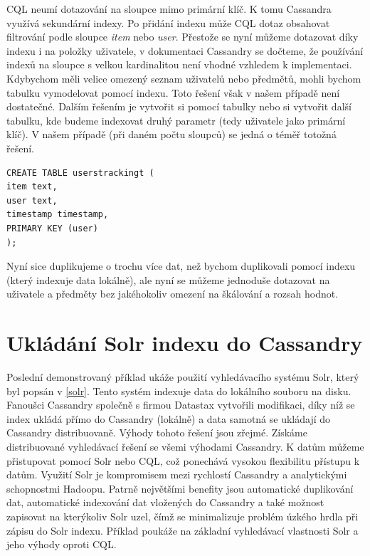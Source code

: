 CQL neumí dotazování na sloupce mimo primární klíč. K tomu Cassandra využívá sekundární indexy. Po přidání indexu může CQL dotaz obsahovat filtrování podle sloupce \emph{item} nebo \emph{user}. Přestože se nyní můžeme dotazovat díky indexu i na položky uživatele, v dokumentaci Cassandry \cite{cassaindex} se dočteme, že používání indexů na sloupce s velkou kardinalitou není vhodné vzhledem k implementaci. Kdybychom měli velice omezený seznam uživatelů nebo předmětů, mohli bychom tabulku vymodelovat pomocí indexu. Toto řešení však v našem případě není dostatečné. Dalším řešením je vytvořit si  pomocí tabulky nebo si vytvořit další tabulku, kde budeme indexovat druhý parametr (tedy uživatele jako primární klíč). V našem případě (při daném počtu sloupců) se jedná o téměř totožná řešení. 

\begin{lstlisting}[caption={Vytvoření indexovací tabulky},label=CQL11]
CREATE TABLE userstrackingt ( 
item text,
user text,
timestamp timestamp,
PRIMARY KEY (user)
);
\end{lstlisting}

Nyní sice duplikujeme o trochu více dat, než bychom duplikovali pomocí indexu (který indexuje data lokálně), ale nyní se můžeme jednoduše dotazovat na uživatele a předměty bez jakéhokoliv omezení na škálování a rozsah hodnot. 

\section{Ukládání Solr indexu do Cassandry}
Poslední demonstrovaný příklad ukáže použití vyhledávacího systému Solr, který byl popsán v  \ref{solr}. Tento systém indexuje data do lokálního souboru na disku. Fanoušci Cassandry společně s firmou Datastax vytvořili modifikaci, díky níž se index ukládá přímo do Cassandry (lokálně) a data samotná se ukládají do Cassandry distribuovaně. Výhody tohoto řešení jsou zřejmé. Získáme distribuované vyhledávací řešení se všemi výhodami Cassandry. K datům můžeme přistupovat pomocí Solr nebo CQL, což ponechává vysokou flexibilitu přístupu k datům. Využití Solr je kompromisem mezi rychlostí Cassandry a analytickými schopnostmi Hadoopu. Patrně největšími benefity jsou automatické duplikování dat, automatické indexování dat vložených do Cassandry a také možnost zapisovat na kterýkoliv Solr uzel, čímž se minimalizuje problém úzkého hrdla při zápisu do Solr indexu. Příklad poukáže na základní vyhledávací vlastnosti Solr a jeho výhody oproti CQL.